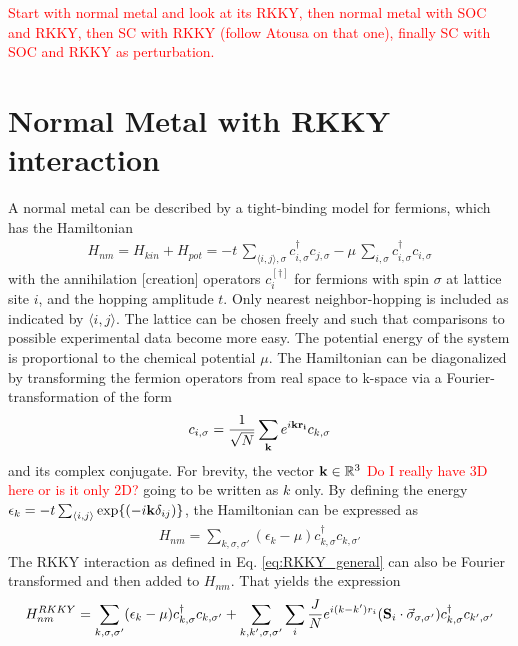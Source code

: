 \newpage
\textcolor{red}{Start with normal metal and look at its RKKY, then normal metal with SOC and RKKY, then SC with RKKY (follow Atousa on that one), finally SC with SOC and RKKY as perturbation.}
\section{Normal Metal with RKKY interaction}
A normal metal can be described by a tight-binding model for fermions, which has the Hamiltonian
\begin{align}\nonumber
    H_{nm} = H_{kin} + H_{pot} = -t \, \sum_{\langle i,j \rangle, \sigma} c^{\dag}_{i,\sigma}c_{j,\sigma}  -\mu \, \sum_{i, \sigma} c^{\dag}_{i,\sigma}c_{i,\sigma}
\end{align}
with the annihilation [creation] operators $c^{[\dag]}_i$ for fermions with spin $\sigma$ at lattice site $i$, and the hopping amplitude $t$. 
Only nearest neighbor-hopping is included as indicated by $ \langle i,j \rangle$.
The lattice can be chosen freely and such that comparisons to possible experimental data become more easy.\newline
The potential energy of the system is proportional to the chemical potential $\mu$. \newline
The Hamiltonian can be diagonalized by transforming the fermion operators from real space to k-space via a Fourier-transformation of the form
\begin{equation} \label{eq:fouriertrafo_fermions}
    c_{i, \sigma} = \frac{1}{\sqrt{N}}\sum_{\vb{k}} e^{i\vb{k}\vb{r_i}}c_{k, \sigma}
\end{equation}
and its complex conjugate. 
For brevity, the vector $\vb{k} \in \mathbb{R}^3$ \textcolor{red}{Do I really have 3D here or is it only 2D?} going to be written as $k$ only.\newline
By defining the energy $\epsilon_k=-t\sum_{\langle i,j \rangle} \exp{(-i\vb{k}\delta_{ij})}$, the Hamiltonian can be expressed as
\begin{align}\label{eq:ham_normalmetal}
    H_{nm} = \sum_{k,\sigma, \sigma'} (\epsilon_k - \mu) c^{\dag}_{k,\sigma}c_{k,\sigma'}
\end{align}
The RKKY interaction as defined in Eq. \eqref{eq:RKKY_general} can also be Fourier transformed and then added to $H_{nm}$. 
That yields the expression
\begin{align}\nonumber
    H^{RKKY}_{nm} = \sum_{k,\sigma, \sigma'} (\epsilon_k - \mu) c^{\dag}_{k,\sigma}c_{k,\sigma'} + \sum_{k,k',\sigma, \sigma'} \sum_i \frac{J}{N}e^{i(k-k')r_i}(\vb{S}_i\cdot \Vec{\sigma}_{\sigma, \sigma'})c^{\dag}_{k,\sigma}c_{k',\sigma'}
\end{align}
